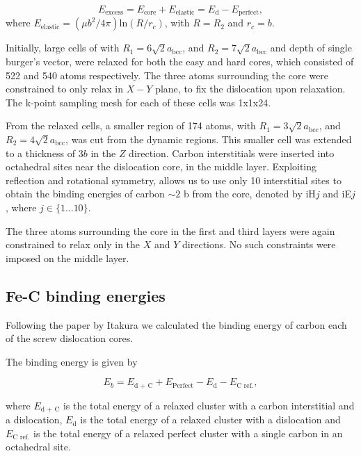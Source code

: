 \documentclass[a4paper,11pt]{article}
\begin{document}
\begin{equation}
 E_{\text{excess}} =   E_{\text{core}} + E_{\text{elastic}} = E_{\text{d}} - E_{\text{perfect}}   ,\label{eq:excessenergy}
 \end{equation} 
where
\(E_{\text{elastic}} = ( \mu b^2 / 4\pi )\text{ln}(R/ r_c)\), with \(R = R_2\) and \(r_c = b\).

Initially, large cells of with \(R_1 = 6\sqrt{2}a_{\text{bcc}}\), and \(R_2 =
   7\sqrt{2}a_{\text{bcc}}\) and depth of single burger's vector, were relaxed
for both the easy and hard cores, which consisted of 522 and 540 atoms
respectively. The three atoms surrounding the core were constrained to only
relax in \(X-Y\) plane, to fix the dislocation upon relaxation. 
The k-point sampling mesh for each of these cells was 1x1x24.

From the relaxed cells, a smaller region of 174 atoms, with \(R_1 =
   3\sqrt{2}a_{\text{bcc}}\), and \(R_2 = 4\sqrt{2}a_{\text{bcc}}\), was cut from
the dynamic regions. This smaller cell was extended to a thickness of 3\(b\) in
the \(Z\) direction. Carbon interstitials were inserted into octahedral sites
near the dislocation core, in the middle layer. Exploiting reflection and
rotational symmetry, allows us to use only 10 interstitial
sites to obtain the binding energies of carbon \(\sim2\) b from the core, denoted by iH\(j\) and iE\(j\),
where \(j \in \{1\dots10\}\). 

The three atoms surrounding the core in the first and third layers were again
constrained to relax only in the \(X\) and \(Y\) directions. No such constraints
were imposed on the middle layer. 


\subsection{Fe-C binding energies}
\label{sec:orgfbeaaf7}
Following the paper by Itakura
\cite{itakura13_effec_hydrog_atoms_screw_disloc} we calculated the
binding energy of carbon each of the screw dislocation cores. 

The binding energy is given by 

\begin{equation}  
E_b = E_{\text{d + C}} + E_{\text{Perfect}}- E_{\text{d}} - E_{\text{C ref.}},    
\end{equation}

where \(E_{\text{d + C}}\) is the total energy of a relaxed cluster with a
carbon interstitial and a dislocation, \(E_{\text{d}}\) is the total
energy of a relaxed cluster with a dislocation and \(E_{\text{C
    ref.}}\) is the total energy of a relaxed perfect cluster with a single carbon in
an octahedral site.
\end{document}

